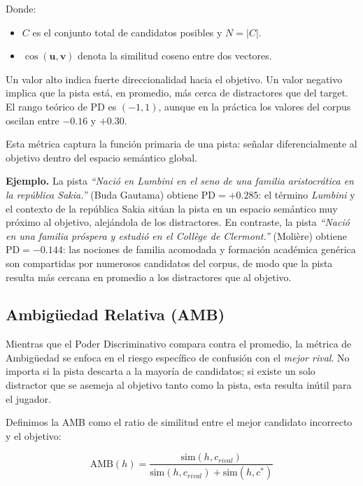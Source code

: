 \documentclass[../main.tex]{subfiles}
\begin{document}
Donde:
\begin{itemize}
    \item $C$ es el conjunto total de candidatos posibles y $N = |C|$.
    \item $\cos(\mathbf{u}, \mathbf{v})$ denota la similitud coseno entre dos vectores.
\end{itemize}

Un valor alto indica fuerte direccionalidad hacia el objetivo.
Un valor negativo implica que la pista está, en promedio, más cerca de distractores que del target.
El rango teórico de PD es $(-1, 1)$, aunque en la práctica los valores del corpus oscilan entre $-0.16$ y $+0.30$.

Esta métrica captura la función primaria de una pista: señalar diferencialmente al objetivo dentro del espacio semántico global.

\medskip
\textbf{Ejemplo.} La pista \textit{``Nació en Lumbini en el seno de una familia aristocrática en la república Sakia.''} (Buda Gautama) obtiene $\text{PD} = +0.285$: el término \textit{Lumbini} y el contexto de la república Sakia sitúan la pista en un espacio semántico muy próximo al objetivo, alejándola de los distractores. En contraste, la pista \textit{``Nació en una familia próspera y estudió en el Collège de Clermont.''} (Molière) obtiene $\text{PD} = -0.144$: las nociones de familia acomodada y formación académica genérica son compartidas por numerosos candidatos del corpus, de modo que la pista resulta más cercana en promedio a los distractores que al objetivo.

\subsection{Ambigüedad Relativa (AMB)}

Mientras que el Poder Discriminativo compara contra el promedio, la métrica de Ambigüedad se enfoca en el riesgo específico de confusión con el \textit{mejor rival}. No importa si la pista descarta a la mayoría de candidatos; si existe un solo distractor que se asemeja al objetivo tanto como la pista, esta resulta inútil para el jugador.

Definimos la AMB como el ratio de similitud entre el mejor candidato incorrecto y el objetivo:

\begin{equation}
\text{AMB}(h) =
\frac{\text{sim}(h, c_{rival})}
{\text{sim}(h, c_{rival}) + \text{sim}(h, c^*)}
\end{equation}
\end{document}
